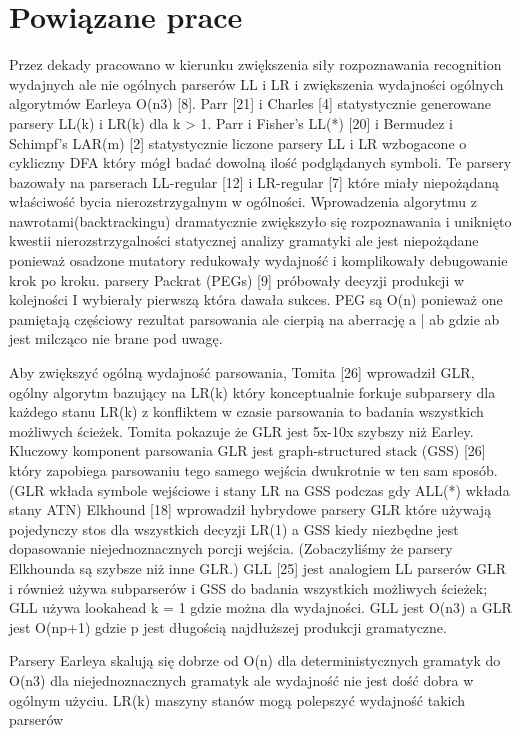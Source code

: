 \section{Powiązane prace}
Przez dekady pracowano w kierunku zwiększenia
siły rozpoznawania recognition wydajnych ale nie ogólnych
parserów LL i LR i zwiększenia wydajności ogólnych algorytmów
Earleya O(n3) [8]. Parr [21] i Charles [4] statystycznie generowane parsery LL(k) i LR(k)
dla k > 1. Parr i Fisher’s LL(*) [20] i Bermudez i Schimpf’s LAR(m) [2]
statystycznie liczone parsery LL i LR wzbogacone o cykliczny
DFA który mógł badać dowolną ilość podglądanych symboli. Te
parsery bazowały na parserach LL-regular [12] i LR-regular [7]
które miały niepożądaną właściwość bycia nierozstrzygalnym w ogólności.
Wprowadzenia algorytmu z nawrotami(backtrackingu) dramatycznie zwiększyło się rozpoznawania
i uniknięto kwestii nierozstrzygalności statycznej analizy gramatyki
ale jest niepożądane ponieważ osadzone mutatory redukowały wydajność
i komplikowały debugowanie krok po kroku. parsery Packrat (PEGs) [9] próbowały decyzji
produkcji w kolejności I wybierały pierwszą która dawała sukces. PEG są
O(n) ponieważ one pamiętają częściowy rezultat parsowania ale cierpią
na aberrację a | ab gdzie ab jest milcząco nie brane pod uwagę.
\par
Aby zwiększyć ogólną wydajność parsowania, Tomita [26] wprowadził GLR, ogólny algorytm
bazujący na LR(k) który konceptualnie forkuje subparsery dla każdego stanu
LR(k) z konfliktem w czasie parsowania to badania wszystkich możliwych ścieżek.
Tomita pokazuje że GLR jest 5x-10x szybszy niż Earley. Kluczowy komponent
parsowania GLR jest graph-structured stack (GSS) [26] który zapobiega parsowaniu
tego samego wejścia dwukrotnie w ten sam sposób.
(GLR wkłada symbole wejściowe i stany LR na GSS podczas gdy ALL(*) wkłada stany ATN)
Elkhound [18] wprowadził hybrydowe parsery GLR które używają pojedynczy stos
dla wszystkich decyzji LR(1) a GSS kiedy niezbędne jest dopasowanie
niejednoznacznych porcji wejścia. (Zobaczyliśmy że parsery Elkhounda
są szybsze niż inne GLR.) GLL [25] jest analogiem LL parserów GLR
i również używa subparserów i GSS do badania wszystkich możliwych ścieżek;
GLL używa lookahead k = 1 gdzie można dla wydajności.
GLL jest O(n3) a GLR jest O(np+1)
gdzie p jest długością najdłuższej produkcji gramatyczne.
\par
Parsery Earleya skalują się dobrze od  O(n) dla deterministycznych gramatyk
do O(n3) dla niejednoznacznych gramatyk ale wydajność
nie jest dość dobra w ogólnym użyciu.
LR(k) maszyny stanów mogą polepszyć wydajność takich parserów
